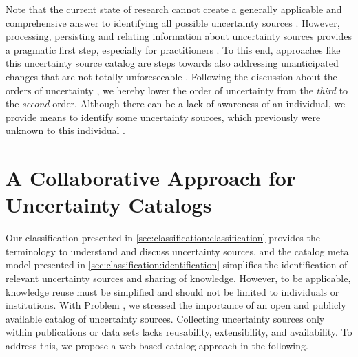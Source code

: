Note that the current state of research cannot create a generally applicable and comprehensive answer to identifying all possible uncertainty sources \cite{weyns_towards_2023}.
However, processing, persisting and relating information about uncertainty sources provides a pragmatic first step, especially for practitioners \cite{hahner_arcn_2024}.
To this end, approaches like this uncertainty source catalog are steps towards also addressing unanticipated changes that are not totally unforeseeable \cite{garlan_software_2010}.
Following the discussion about the orders of uncertainty \cite{armour_five_2000}, we hereby lower the order of uncertainty from the \emph{third} to the \emph{second} order. 
Although there can be a lack of awareness of an individual, we provide means to identify some uncertainty sources, which previously were unknown to this individual \cite{perez-palacin_uncertainties_2014}.






\section{A Collaborative Approach for Uncertainty Catalogs}%
\label{sec:classification:collaboration}

Our classification presented in \autoref{sec:classification:classification} provides the terminology to understand and discuss uncertainty sources, and the catalog meta model presented in \autoref{sec:classification:identification} simplifies the identification of relevant uncertainty sources and sharing of knowledge.
However, to be applicable, knowledge reuse must be simplified and should not be limited to individuals or institutions.
With Problem , we stressed the importance of an open and publicly available catalog of uncertainty sources.
Collecting uncertainty sources only within publications \cite{ramirez_taxonomy_2012} or data sets \cite{hahner_classification_2023} lacks reusability, extensibility, and availability.
To address this, we propose a web-based catalog approach in the following.

